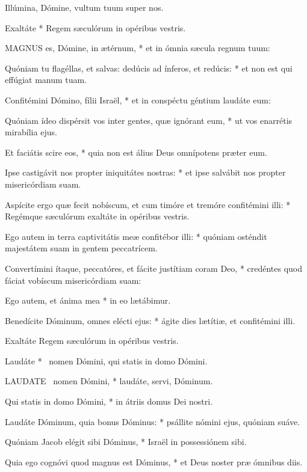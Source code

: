  Illúmina, Dómine, vultum tuum super nos.

 Exaltáte * Regem sæculórum in opéribus vestris.


\lettrine[lines=2]{M}{AGNUS} es, Dómine, in ætérnum, * et in ómnia sæcula regnum tuum:

Quóniam tu flagéllas, et salvas: dedúcis ad ínferos, et redúcis: * et non est qui effúgiat manum tuam.

Confitémini Dómino, fílii Israël, * et in conspéctu géntium laudáte eum:

Quóniam ídeo dispérsit vos inter gentes, quæ ignórant eum, * ut vos enarrétis mirabília ejus.

Et faciátis scire eos, * quia non est álius Deus omnípotens præter eum.

Ipse castigávit nos propter iniquitátes nostras: * et ipse salvábit nos propter misericórdiam suam.

Aspícite ergo quæ fecit nobíscum, et cum timóre et tremóre confitémini illi: * Regémque sæculórum exaltáte in opéribus vestris.

Ego autem in terra captivitátis meæ confitébor illi: * quóniam osténdit majestátem suam in gentem peccatrícem.

Convertímini ítaque, peccatóres, et fácite justítiam coram Deo, * credéntes quod fáciat vobíscum misericórdiam suam:

Ego autem, et ánima mea * in eo lætábimur.

Benedícite Dóminum, omnes elécti ejus: * ágite dies lætítiæ, et confitémini illi.

 Exaltáte Regem sæculórum in opéribus vestris.

 Laudáte * \textdagger\ nomen Dómini, qui statis in domo Dómini.


\lettrine[lines=2]{L}{AUDATE} \textdagger\ nomen Dómini, * laudáte, servi, Dóminum.

Qui statis in domo Dómini, * in átriis domus Dei nostri.

Laudáte Dóminum, quia bonus Dóminus: * psállite nómini ejus, quóniam suáve.

Quóniam Jacob elégit sibi Dóminus, * Israël in possessiónem sibi.

Quia ego cognóvi quod magnus est Dóminus, * et Deus noster præ ómnibus diis.

